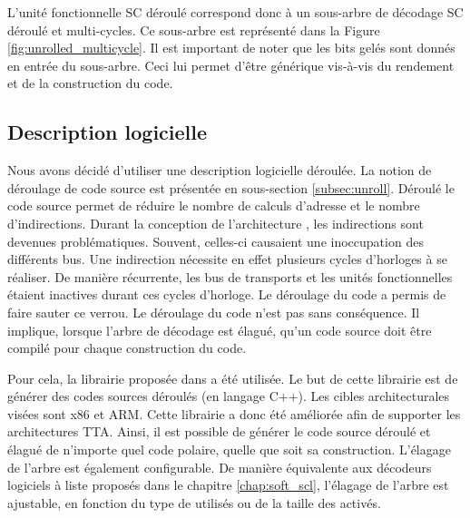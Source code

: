 L'unité fonctionnelle \og SC déroulé \fg correspond donc à un sous-arbre de décodage SC déroulé et multi-cycles. Ce sous-arbre est représenté dans la Figure \ref{fig:unrolled_multicycle}. Il est important de noter que les bits gelés sont donnés en entrée du sous-arbre. Ceci lui permet d'être générique vis-à-vis du rendement et de la construction du code.

\subsection{Description logicielle}

Nous avons décidé d'utiliser une description logicielle déroulée. La notion de déroulage de code source est présentée en sous-section \ref{subsec:unroll}. Déroulé le code source permet de réduire le nombre de calculs d'adresse et le nombre d'indirections. Durant la conception de l'architecture \TTSC, les indirections sont devenues problématiques. Souvent, celles-ci causaient une inoccupation des différents bus. Une indirection nécessite en effet plusieurs cycles d'horloges à se réaliser. De manière récurrente, les bus de transports et les unités fonctionnelles étaient inactives durant ces cycles d'horloge. Le déroulage du code a permis de faire sauter ce verrou. Le déroulage du code n'est pas sans conséquence. Il implique, lorsque l'arbre de décodage est élagué, qu'un code source doit être compilé pour chaque construction du code.

Pour cela, la librairie proposée dans \cite{cassagne_efficient_2015} a été utilisée. Le but de cette librairie est de générer des codes sources déroulés (en langage C++). Les cibles architecturales visées sont x86 et ARM. Cette librairie a donc été améliorée afin de supporter les architectures TTA. Ainsi, il est possible de générer le code source déroulé et élagué de n'importe quel code polaire, quelle que soit sa construction. L'élagage de l'arbre est également configurable. De manière équivalente aux décodeurs logiciels à liste proposés dans le chapitre \ref{chap:soft_scl}, l'élagage de l'arbre est ajustable, en fonction du type de \noeuds utilisés ou de la taille des \noeuds activés.


